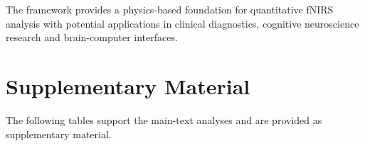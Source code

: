 \documentclass[11pt]{article}
\begin{document}
The framework provides a physics-based foundation for quantitative fNIRS analysis with potential applications in clinical diagnostics, cognitive neuroscience research and brain-computer interfaces.





\clearpage
\section*{Supplementary Material}
\setcounter{table}{0}
\renewcommand{\thetable}{S\arabic{table}}
\renewcommand{\theHtable}{S\arabic{table}}
\noindent The following tables support the main-text analyses and are provided as supplementary material.
\end{document}

